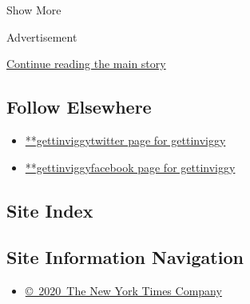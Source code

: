 Show More

Advertisement

\protect\hyperlink{after-mid2}{Continue reading the main story}

\hypertarget{follow-elsewhere}{%
\subsection{Follow Elsewhere}\label{follow-elsewhere}}

\begin{itemize}
\tightlist
\item
  \href{https://twitter.com/gettinviggy}{**gettinviggytwitter page for
  gettinviggy}
\item
  \href{https://www.facebookcorewwwi.onion/gettinviggy}{**gettinviggyfacebook
  page for gettinviggy}
\end{itemize}

\hypertarget{site-index}{%
\subsection{Site Index}\label{site-index}}

\hypertarget{site-information-navigation}{%
\subsection{Site Information
Navigation}\label{site-information-navigation}}

\begin{itemize}
\tightlist
\item
  \href{https://help.nytimes3xbfgragh.onion/hc/en-us/articles/115014792127-Copyright-notice}{©~2020~The
  New York Times Company}
\end{itemize}


